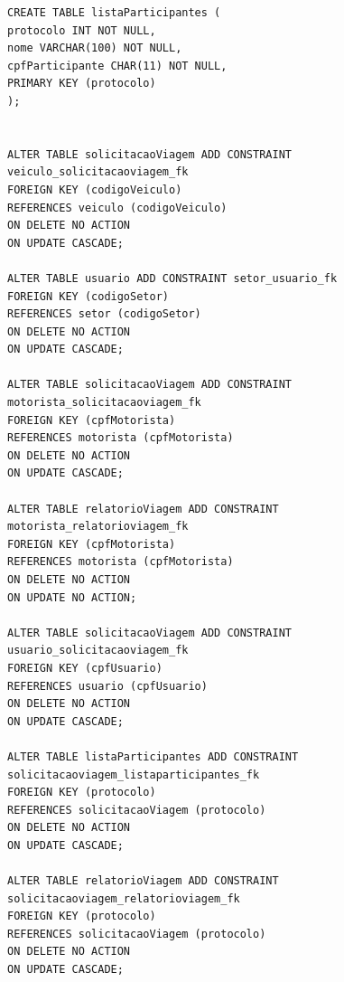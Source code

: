 \documentclass[11pt]{article}
\begin{document}
\begin{verbatim}
CREATE TABLE listaParticipantes (
protocolo INT NOT NULL,
nome VARCHAR(100) NOT NULL,
cpfParticipante CHAR(11) NOT NULL,
PRIMARY KEY (protocolo)
);


ALTER TABLE solicitacaoViagem ADD CONSTRAINT veiculo_solicitacaoviagem_fk
FOREIGN KEY (codigoVeiculo)
REFERENCES veiculo (codigoVeiculo)
ON DELETE NO ACTION
ON UPDATE CASCADE;

ALTER TABLE usuario ADD CONSTRAINT setor_usuario_fk
FOREIGN KEY (codigoSetor)
REFERENCES setor (codigoSetor)
ON DELETE NO ACTION
ON UPDATE CASCADE;

ALTER TABLE solicitacaoViagem ADD CONSTRAINT motorista_solicitacaoviagem_fk
FOREIGN KEY (cpfMotorista)
REFERENCES motorista (cpfMotorista)
ON DELETE NO ACTION
ON UPDATE CASCADE;

ALTER TABLE relatorioViagem ADD CONSTRAINT motorista_relatorioviagem_fk
FOREIGN KEY (cpfMotorista)
REFERENCES motorista (cpfMotorista)
ON DELETE NO ACTION
ON UPDATE NO ACTION;

ALTER TABLE solicitacaoViagem ADD CONSTRAINT usuario_solicitacaoviagem_fk
FOREIGN KEY (cpfUsuario)
REFERENCES usuario (cpfUsuario)
ON DELETE NO ACTION
ON UPDATE CASCADE;

ALTER TABLE listaParticipantes ADD CONSTRAINT solicitacaoviagem_listaparticipantes_fk
FOREIGN KEY (protocolo)
REFERENCES solicitacaoViagem (protocolo)
ON DELETE NO ACTION
ON UPDATE CASCADE;

ALTER TABLE relatorioViagem ADD CONSTRAINT solicitacaoviagem_relatorioviagem_fk
FOREIGN KEY (protocolo)
REFERENCES solicitacaoViagem (protocolo)
ON DELETE NO ACTION
ON UPDATE CASCADE;
\end{verbatim}
\end{document}
